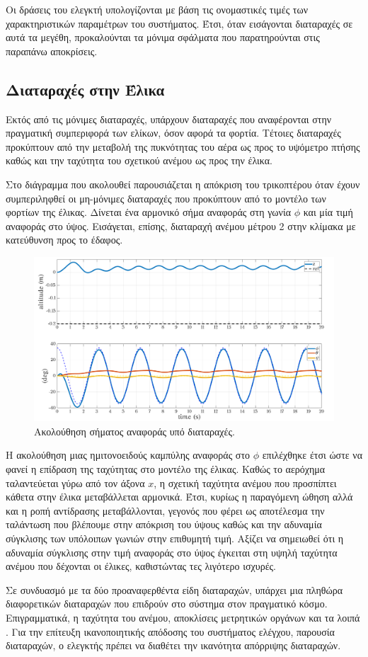 Οι δράσεις του ελεγκτή υπολογίζονται με βάση τις ονομαστικές τιμές των 
χαρακτηριστικών παραμέτρων του συστήματος. Έτσι, όταν εισάγονται διαταραχές σε 
αυτά τα μεγέθη, προκαλούνται τα μόνιμα σφάλματα που παρατηρούνται στις παραπάνω 
αποκρίσεις.

\subsection{Διαταραχές στην Έλικα}
\noindent Εκτός από τις μόνιμες διαταραχές, υπάρχουν διαταραχές που αναφέρονται 
στην πραγματική συμπεριφορά των ελίκων, όσον αφορά τα φορτία. Τέτοιες διαταραχές
προκύπτουν από την μεταβολή της πυκνότητας του αέρα ως προς το υψόμετρο πτήσης 
καθώς και την ταχύτητα του σχετικού ανέμου ως προς την έλικα.

Στο διάγραμμα που ακολουθεί παρουσιάζεται η απόκριση του τρικοπτέρου όταν έχουν 
συμπεριληφθεί οι μη-μόνιμες διαταραχές που προκύπτουν από το μοντέλο των φορτίων
της έλικας. Δίνεται ένα αρμονικό σήμα αναφοράς στη γωνία $\phi$ και μία τιμή 
αναφοράς στο ύψος. Εισάγεται, επίσης, διαταραχή ανέμου μέτρου 2 στην κλίμακα 
 με κατεύθυνση προς το έδαφος.

\begin{figure}[H]
    \centering
    \includegraphics[width=1\textwidth]{Control/Nominal/fig_disturbance_2.png}
    \caption{Ακολούθηση σήματος αναφοράς υπό διαταραχές.}
    \label{fig:dist_1}
\end{figure}

Η ακολούθηση μιας ημιτονοειδούς καμπύλης αναφοράς στο $\phi$ επιλέχθηκε έτσι 
ώστε να φανεί η επίδραση της ταχύτητας στο μοντέλο της έλικας. Καθώς το αερόχημα
ταλαντεύεται γύρω από τον άξονα $x$, η σχετική ταχύτητα ανέμου που προσπίπτει 
κάθετα στην έλικα μεταβάλλεται αρμονικά. Έτσι, κυρίως η παραγόμενη ώθηση αλλά 
και η ροπή αντίδρασης μεταβάλλονται, γεγονός που φέρει ως αποτέλεσμα την 
ταλάντωση που βλέπουμε στην απόκριση του ύψους καθώς και την αδυναμία σύγκλισης
των υπόλοιπων γωνιών  στην επιθυμητή τιμή. Αξίζει να σημειωθεί ότι η 
αδυναμία σύγκλισης στην τιμή αναφοράς στο ύψος έγκειται στη υψηλή ταχύτητα 
ανέμου που δέχονται οι έλικες, καθιστώντας τες λιγότερο ισχυρές.  

Σε συνδυασμό με τα δύο προαναφερθέντα είδη διαταραχών, υπάρχει μια πληθώρα 
διαφορετικών διαταραχών που επιδρούν στο σύστημα στον πραγματικό κόσμο. 
Επιγραμματικά, η ταχύτητα του ανέμου, αποκλίσεις μετρητικών οργάνων και τα λοιπά
. Για την επίτευξη ικανοποιητικής απόδοσης του συστήματος ελέγχου, παρουσία 
διαταραχών, ο ελεγκτής πρέπει να διαθέτει την ικανότητα απόρριψης διαταραχών.